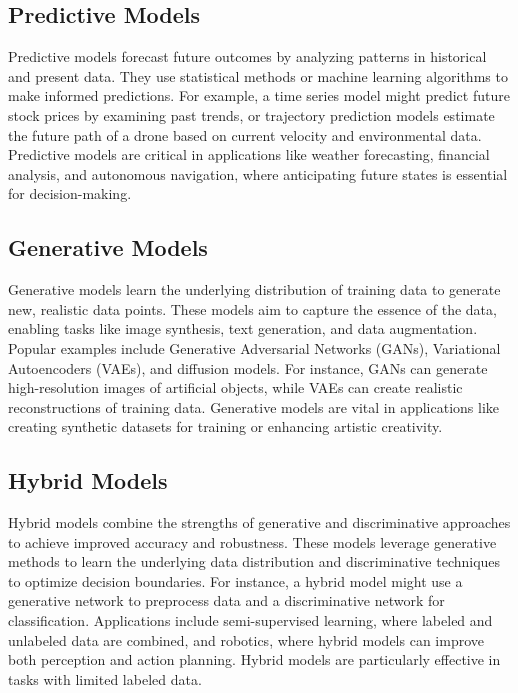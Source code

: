 \subsection{Predictive Models}
Predictive models forecast future outcomes by analyzing patterns in historical and present data. They use statistical methods or machine learning algorithms to make informed predictions. For example, a time series model might predict future stock prices by examining past trends, or trajectory prediction models estimate the future path of a drone based on current velocity and environmental data. Predictive models are critical in applications like weather forecasting, financial analysis, and autonomous navigation, where anticipating future states is essential for decision-making. 

\subsection{Generative Models}
Generative models learn the underlying distribution of training data to generate new, realistic data points. These models aim to capture the essence of the data, enabling tasks like image synthesis, text generation, and data augmentation. Popular examples include Generative Adversarial Networks (GANs), Variational Autoencoders (VAEs), and diffusion models. For instance, GANs can generate high-resolution images of artificial objects, while VAEs can create realistic reconstructions of training data. Generative models are vital in applications like creating synthetic datasets for training or enhancing artistic creativity. 



\subsection{Hybrid Models}
Hybrid models combine the strengths of generative and discriminative approaches to achieve improved accuracy and robustness. These models leverage generative methods to learn the underlying data distribution and discriminative techniques to optimize decision boundaries. For instance, a hybrid model might use a generative network to preprocess data and a discriminative network for classification. Applications include semi-supervised learning, where labeled and unlabeled data are combined, and robotics, where hybrid models can improve both perception and action planning. Hybrid models are particularly effective in tasks with limited labeled data. 

